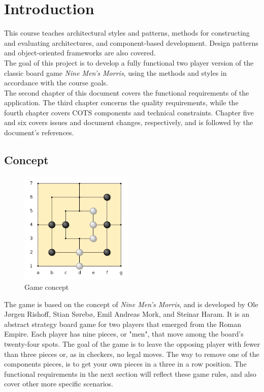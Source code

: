 \section{Introduction}
This course teaches architectural styles and patterns, methods for constructing and evaluating architectures, and component-based development. Design patterns and object-oriented frameworks are also covered. \\

The goal of this project is to develop a fully functional two player version of the classic board game \emph{Nine Men's Morris}, using the methods and styles in accordance with the course goals. \\

The second chapter of this document covers the functional requirements of the application. The third chapter concerns the quality requirements, while the fourth chapter covers COTS components and technical constraints. Chapter five and six covers issues and document changes, respectively, and is followed by the document's references.



\subsection{Concept}

\begin{figure}
  \begin{center}
  \vspace{-32pt}
    \includegraphics[width=0.48\textwidth]{concept2.png}
  \end{center}
  \vspace{-20pt}
  \caption{Game concept}
  \vspace{1pt}
\end{figure}

The game is based on the concept of \emph{Nine Men's Morris}, and is developed by Ole Jørgen Rishoff, Stian Sørebø, Emil Andreas Mork, and Steinar Haram. It is an abstract strategy board game for two players that emerged from the Roman Empire. Each player has nine pieces, or "men", that move among the board's twenty-four spots. The goal of the game is to leave the opposing player with fewer than three pieces or, as in checkers, no legal moves. The way to remove one of the components pieces, is to get your own pieces in a three in a row position. The functional requirements in the next section will reflect these game rules, and also cover other more specific scenarios. 



